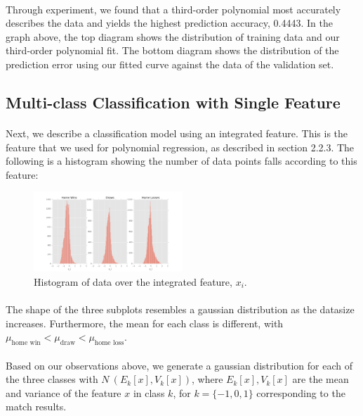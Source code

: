 \documentclass[12pt]{article}
\begin{document}
\paragraph{}
Through experiment, we found that a third-order polynomial most accurately describes the data and yields the highest prediction accuracy, 0.4443. In the graph above, the top diagram shows the distribution of training data and our third-order polynomial fit. The bottom diagram shows the distribution of the prediction error using our fitted curve against the data of the validation set.

\subsection{Multi-class Classification with Single Feature}
\paragraph{}
Next, we describe a classification model using an integrated feature. This is the feature that we used for polynomial regression, as described in section 2.2.3. The following is a histogram showing the number of data points falls according to this feature:
\begin{figure}[!ht]
	\centering
	\includegraphics[width=0.5\textwidth]{1D_all.png}
	\caption{Histogram of data over the integrated feature, $x_i$.}
\end{figure}
\paragraph{}
The shape of the three subplots resembles a gaussian distribution as the datasize increases. Furthermore, the mean for each class is different, with $\mu_{\text{home win}} < \mu_{\text{draw}} < \mu_{\text{home loss}}$.
\paragraph{}
Based on our observations above, we generate a gaussian distribution for each of the three classes with $N ~ (E_k[x], V_k[x])$, where $E_k[x], V_k[x]$ are the mean and variance of the feature $x$ in class $k$, for $k = \{-1, 0, 1\}$ corresponding to the match results.
\end{document}
